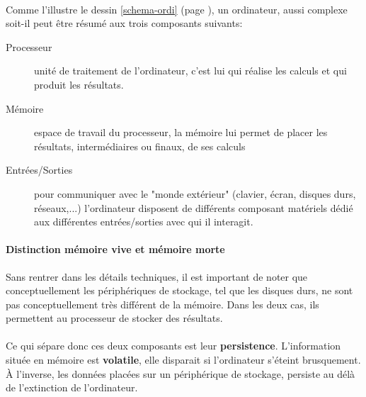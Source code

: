 {  \paragraph{} Comme l'illustre le dessin \ref{schema-ordi} (page \pageref{schema-ordi}), un
  ordinateur, aussi complexe soit-il peut être résumé aux trois composants suivants:
  \begin{description}
    \item[Processeur] unité de traitement de l'ordinateur, c'est lui qui réalise les calculs et qui
    produit les résultats.
    \item[Mémoire] espace de travail du processeur, la mémoire lui permet de placer les résultats,
    intermédiaires ou finaux, de ses calculs
    \item[Entrées/Sorties] pour communiquer avec le "monde extérieur" (clavier, écran, disques durs,
    réseaux,...) l'ordinateur disposent de différents composant matériels dédié aux différentes
    entrées/sorties avec qui il interagit.
  \end{description}

  \paragraph{Distinction mémoire vive et mémoire morte} Sans rentrer dans les détails techniques, il
  est important de noter que conceptuellement les périphériques de stockage, tel que les disques durs,
  ne sont pas conceptuellement très différent de la mémoire. Dans les deux cas, ils permettent au
  processeur de stocker des résultats.

  \paragraph{} Ce qui sépare donc ces deux composants est leur \textbf{persistence}. L'information
  située en mémoire est \textbf{volatile}, elle disparait si l'ordinateur s'éteint brusquement. À
  l'inverse, les données placées sur un périphérique de stockage, persiste au délà de l'extinction de
  l'ordinateur.
}


